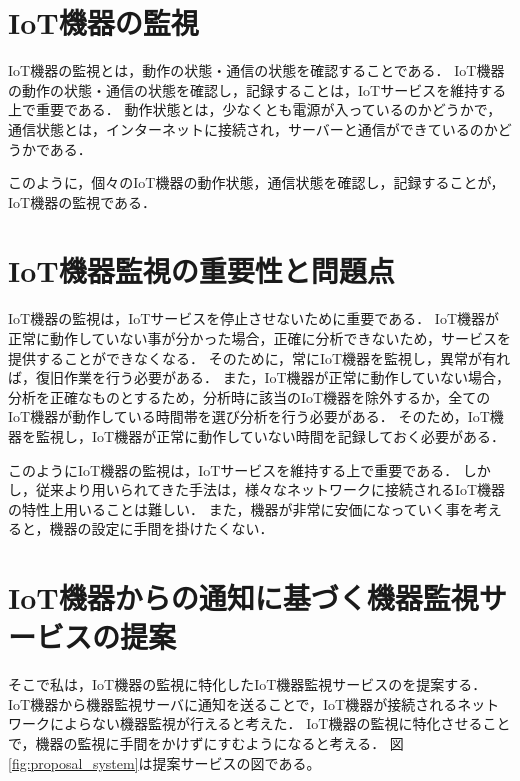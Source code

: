 \section{IoT機器の監視}%
IoT機器の監視とは，動作の状態・通信の状態を確認することである．
IoT機器の動作の状態・通信の状態を確認し，記録することは，IoTサービスを維持する上で重要である．
動作状態とは，少なくとも電源が入っているのかどうかで，通信状態とは，インターネットに接続され，サーバーと通信ができているのかどうかである．
\medskip

このように，個々のIoT機器の動作状態，通信状態を確認し，記録することが，IoT機器の監視である．

\section{IoT機器監視の重要性と問題点}
IoT機器の監視は，IoTサービスを停止させないために重要である．
IoT機器が正常に動作していない事が分かった場合，正確に分析できないため，サービスを提供することができなくなる．
そのために，常にIoT機器を監視し，異常が有れば，復旧作業を行う必要がある．
また，IoT機器が正常に動作していない場合，分析を正確なものとするため，分析時に該当のIoT機器を除外するか，全てのIoT機器が動作している時間帯を選び分析を行う必要がある．
そのため，IoT機器を監視し，IoT機器が正常に動作していない時間を記録しておく必要がある．
\medskip

このようにIoT機器の監視は，IoTサービスを維持する上で重要である．
しかし，従来より用いられてきた手法は，様々なネットワークに接続されるIoT機器の特性上用いることは難しい．
また，機器が非常に安価になっていく事を考えると，機器の設定に手間を掛けたくない．

\section{IoT機器からの通知に基づく機器監視サービスの提案}
そこで私は，IoT機器の監視に特化したIoT機器監視サービスのを提案する．
IoT機器から機器監視サーバに通知を送ることで，IoT機器が接続されるネットワークによらない機器監視が行えると考えた．
IoT機器の監視に特化させることで，機器の監視に手間をかけずにすむようになると考える．
図\ref{fig:proposal_system}は提案サービスの図である。

